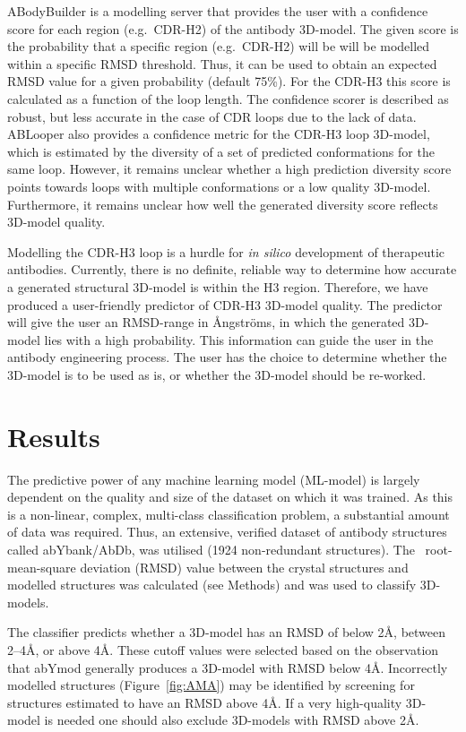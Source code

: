 ABodyBuilder is a modelling server that provides the user with a
confidence score for each region (e.g.\ CDR-H2) of the antibody
3D-model. The given score is the probability that a specific region
(e.g.\ CDR-H2) will be will be modelled within a specific RMSD
threshold\cite{Leem2016}. Thus, it can be used to obtain an expected
RMSD value for a given probability (default 75\%). For the CDR-H3 this
score is calculated as a function of the loop length.  The confidence
scorer is described as robust, but less accurate in the case of CDR
loops due to the lack of data\cite{Leem2016}. ABLooper also provides a
confidence metric for the CDR-H3 loop 3D-model, which is estimated by the
diversity of a set of predicted conformations for the same
loop\cite{Abanades2022}. However, it remains unclear whether a high
prediction diversity score points towards loops with multiple
conformations or a low quality 3D-model. Furthermore, it remains unclear
how well the generated diversity score reflects 3D-model
quality\cite{Abanades2022}.


Modelling the CDR-H3 loop is a hurdle for \emph{in silico} development of
therapeutic antibodies. Currently, there is no definite, reliable way
to determine how accurate a generated structural 3D-model is within the
H3 region. Therefore, we have produced a
user-friendly predictor of CDR-H3 3D-model quality. The predictor will give
the user an RMSD-range in {\AA}ngstr\"{o}ms, in which the generated 3D-model lies
with a high probability.
This information can guide the
user in the antibody engineering process. The user has the choice to
determine whether the 3D-model is to be used as is, or
whether the 3D-model should be re-worked.

\section{Results}

The predictive power of any machine learning model (ML-model) is largely
dependent on the quality and size of the dataset on which it was trained. As
this is a non-linear, complex, multi-class classification problem, a
substantial amount of data was required. Thus, an extensive, verified
dataset of antibody structures called abYbank/AbDb\cite{Ferdous2018},
was utilised (1924 non-redundant
structures). The \ca\ root-mean-square deviation (RMSD) value
between the crystal structures
and modelled structures was calculated (see Methods) and
was used to classify 3D-models.

The classifier predicts whether a 3D-model has an RMSD of below 2\AA,
between 2--4\AA, or above 4\AA. These cutoff values were selected
based on the observation that abYmod generally produces a 3D-model with
RMSD below 4\AA. Incorrectly modelled structures (Figure~\ref{fig:AMA}) may
be identified by screening for structures estimated to have an RMSD
above 4\AA. If a very high-quality 3D-model is needed one should also
exclude 3D-models with RMSD above 2\AA.


